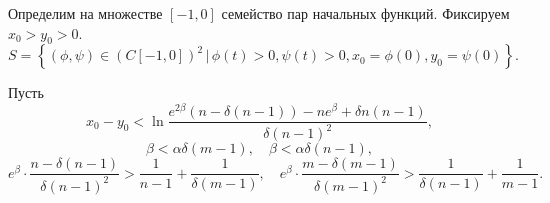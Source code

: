 Определим на множестве $[-1, 0]$ семейство пар начальных функций. Фиксируем $x_0 > y_0 > 0$.
%
\begin{equation}
	\label{eq:initial_set}
	S = \left\{(\phi, \psi) \in (C[-1, 0])^2 \,|\, \phi(t) > 0, \psi(t) > 0, x_0 = \phi(0), y_0 = \psi(0)\right\}.
\end{equation}

\begin{theorem}
	\label{thm:relay_solution}
	Пусть 
	\begin{equation}
		\label{eq:constraint_1}
		x_0 - y_0 < \ln \dfrac{e^{2\beta}(n - \delta(n - 1)) - ne^{\beta} + \delta n(n - 1)}{\delta (n - 1)^2},
	\end{equation}
	\begin{equation}
		\label{eq:constraint_2}
		\beta < \alpha \delta (m - 1), \quad \beta < \alpha \delta (n - 1),
	\end{equation}
	\small
	\begin{equation}
		\label{eq:constraint_3}
		e^{\beta} \cdot \dfrac{n - \delta(n - 1)}{\delta (n - 1)^2} > \dfrac{1}{n - 1} + \dfrac{1}{\delta(m - 1)}, \quad
		e^{\beta} \cdot \dfrac{m - \delta(m - 1)}{\delta (m - 1)^2} > \dfrac{1}{\delta(n - 1)} + \dfrac{1}{m - 1}.
	\end{equation}
	\normalsize
	

\end{theorem}
